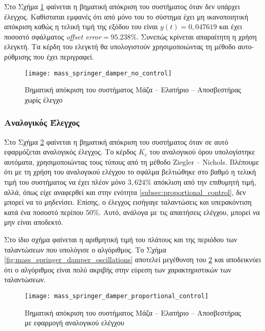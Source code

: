 Στο Σχήμα \ref{fig:mass_springer_damper_no_control} φαίνεται η βηματική απόκριση του συστήματος όταν δεν υπάρχει έλεγχος. Καθίσταται εμφανές ότι από μόνο του το σύστημα έχει μη ικανοποιητική απόκριση καθώς η τελική τιμή της εξόδου του είναι $y(t) = 0,047619$ και έχει ποσοστό σφάλματος \textit{offset error}$= 95.238 \%$. Συνεπώς κρίνεται απαραίτητη η χρήση ελεγκτή. Τα κέρδη του ελεγκτή θα υπολογιστούν χρησιμοποιώντας τη μέθοδο αυτο-ρύθμισης που έχει περιγραφεί.

\begin{figure}[h]
  \centering
  \texttt{[image: mass\_springer\_damper\_no\_control]}
  \caption{Βηματική απόκριση του συστήματος Μάζα -- Ελατήριο -- Αποσβεστήρας χωρίς έλεγχο}
  \label{fig:mass_springer_damper_no_control}
\end{figure}

\subsubsection{Αναλογικός Έλεγχος}

Στο Σχήμα \ref{fig:mass_springer_damper_proportional_control} φαίνεται η βηματική απόκριση του συστήματος όταν σε αυτό εφαρμόζεται αναλογικός έλεγχος. Το κέρδος $K_c$ του αναλογικού όρου υπολογίστηκε αυτόματα, χρησιμοποιώντας τους τύπους από τη μέθοδο Ziegler -- Nichols. Βλέπουμε ότι με τη χρήση του αναλογικού ελέγχου το σφάλμα βελτιώθηκε στο βαθμό η τελική τιμή του συστήματος να έχει πλέον μόνο $3,624\%$ απόκλιση από την επιθυμητή τιμή, αλλά, όπως είχε αναφερθεί και στην ενότητα \ref{subsec:proportional_control}, δεν μπορεί να το μηδενίσει. Επίσης, ο έλεγχος εισήγαγε ταλαντώσεις και υπερακόντιση κατά ένα ποσοστό περίπου $50\%$. Αυτό, ανάλογα με τις απαιτήσεις ελέγχου, μπορεί να μην είναι αποδεκτό.

Στο ίδιο σχήμα φαίνεται η αριθμητική τιμή του πλάτους και της περιόδου των ταλαντώσεων που υπολόγισε ο αλγόριθμος. Το Σχήμα \ref{fig:mass_springer_damper_oscillations} αποτελεί μεγέθυνση του \ref{fig:mass_springer_damper_proportional_control} και αποδεικνύει ότι ο αλγόριθμος είναι πολύ ακριβής στην εύρεση των χαρακτηριστικών των ταλαντώσεων. 

\begin{figure}[h]
  \centering
  \texttt{[image: mass\_springer\_damper\_proportional\_control]}
  \caption{Βηματική απόκριση του συστήματος Μάζα -- Ελατήριο -- Αποσβεστήρας με εφαρμογή αναλογικού ελέγχου}
  \label{fig:mass_springer_damper_proportional_control}
\end{figure}

